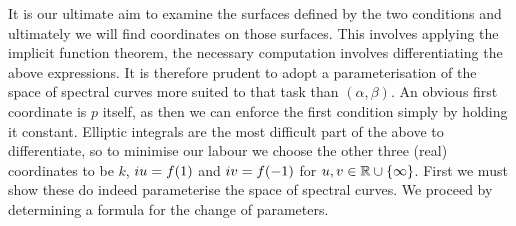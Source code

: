 It is our ultimate aim to examine the surfaces defined by the two conditions and ultimately we will find coordinates on those surfaces. This involves applying the implicit function theorem, the necessary computation involves differentiating the above expressions. It is therefore prudent to adopt a parameterisation of the space of spectral curves more suited to that task than $(α,β)$. An obvious first coordinate is $p$ itself, as then we can enforce the first condition simply by holding it constant. Elliptic integrals are the most difficult part of the above to differentiate, so to minimise our labour we choose the other three (real) coordinates to be $k$, $i u = f(1)$ and $i v = f(-1)$ for $u,v \in \mathbb{R}\cup\{\infty\}$. First we must show these do indeed parameterise the space of spectral curves. We proceed by determining a formula for the change of parameters.

